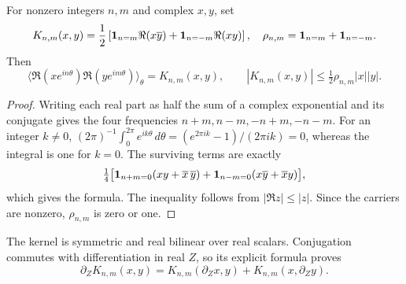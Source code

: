 For nonzero integers $n,m$ and complex $x,y$, set
\begin{equation}
K_{n,m}(x,y)=\frac12\left[
{\bf1}_{n=m}\Re(x\overline y)+{\bf1}_{n=-m}\Re(xy)\right],
\quad \rho_{n,m}={\bf1}_{n=m}+{\bf1}_{n=-m}.
\label{eflux:kernel}
\end{equation}
Then
\begin{equation}
\langle\Re(xe^{in\theta})\Re(ye^{im\theta})\rangle_\theta
=K_{n,m}(x,y),\qquad
|K_{n,m}(x,y)|\le\tfrac12\rho_{n,m}|x||y|.
\label{eflux:angular}
\end{equation}
\begin{proof}
Writing each real part as half the sum of a complex exponential and
its conjugate gives the four frequencies $n+m,n-m,-n+m,-n-m$.
For an integer $k\ne0$,
$(2\pi)^{-1}\int_0^{2\pi}e^{ik\theta}\,d\theta
=(e^{2\pi ik}-1)/(2\pi ik)=0$, whereas the integral is one for $k=0$.
The surviving terms are exactly
\[
\tfrac14\bigl[
{\bf1}_{n+m=0}(xy+\overline x\,\overline y)
+{\bf1}_{n-m=0}(x\overline y+\overline x y)\bigr],
\]
which gives the formula. The inequality follows from
$|\Re z|\le|z|$. Since the carriers are nonzero,
$\rho_{n,m}$ is zero or one.
\end{proof}
The kernel is symmetric and real bilinear over real scalars.
Conjugation commutes with differentiation in real $Z$, so its explicit
formula proves
\begin{equation}
\partial_ZK_{n,m}(x,y)
=K_{n,m}(\partial_Zx,y)+K_{n,m}(x,\partial_Zy).
\label{eflux:product}
\end{equation}

